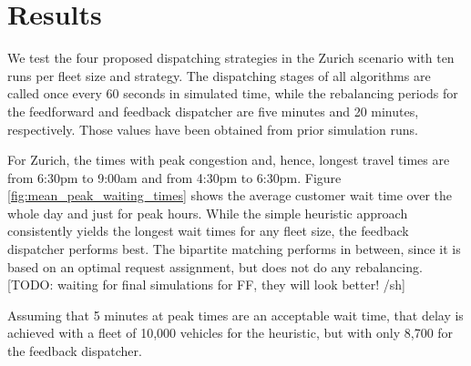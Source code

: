 \section{Results}
\label{sec:results}

We test the four proposed dispatching strategies in the Zurich scenario with ten
runs per fleet size and strategy.%
The dispatching stages of all algorithms are called once every 60 seconds in
simulated time, while the rebalancing periods for the feedforward and feedback
dispatcher are five minutes and 20 minutes, respectively. Those values have been
obtained from prior simulation runs.

For Zurich, the times with peak congestion and, hence, longest travel times
are from 6:30pm to 9:00am and from 4:30pm to 6:30pm. Figure \ref{fig:mean_peak_waiting_times}
shows the average customer wait time over the whole day and just for peak hours.
While the simple heuristic approach consistently yields the longest wait times
for any fleet size, the feedback dispatcher performs best. The bipartite matching
performs in between, since it is based on an optimal request assignment, but does
not do any rebalancing. %
[TODO: waiting for final simulations for FF, they will look better! /sh]

Assuming that 5 minutes at peak times are an acceptable wait time, that delay is
achieved with a fleet of 10,000 vehicles for the heuristic, but with only 8,700
for the feedback dispatcher.

\captionsetup[subfigure]{width=0.9\textwidth}

